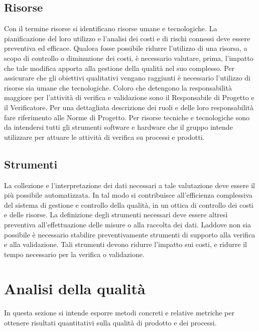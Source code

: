 \documentclass[12pt,a4paper]{article}
\begin{document}
	\subsection{Risorse}\label{risorse}
	Con il termine risorse si identificano risorse umane e tecnologiche. La pianificazione del loro utilizzo e l'analisi dei costi e di rischi connessi deve essere preventiva ed efficace. Qualora fosse possibile ridurre l'utilizzo di una risorsa, a scopo di controllo o diminuzione dei costi, è necessario valutare, prima, l'impatto che tale modifica apporta alla gestione della qualità nel suo complesso.
	Per assicurare che gli obiettivi qualitativi vengano raggiunti è necessario l'utilizzo di
	risorse sia umane che tecnologiche. Coloro che detengono la responsabilità maggiore
	per l'attività di verifica e validazione sono il Responsabile di Progetto e il Verificatore.
	Per una dettagliata descrizione dei ruoli e delle loro responsabilità fare riferimento alle
	Norme di Progetto.
	Per risorse tecniche e tecnologiche sono da intendersi tutti gli strumenti software e hardware che il gruppo intende utilizzare per attuare le attività di verifica su processi
	e prodotti. 
	
	\subsection{Strumenti}

	La collezione e l'interpretazione dei dati necessari a tale valutazione deve essere il più possibile automatizzata. In tal modo si contribuisce all'efficienza complessiva del sistema di gestione e controllo della qualità, in un ottica di controllo dei costi e delle risorse. La definizione degli strumenti necessari deve essere altresì preventiva all'effettuazione delle misure o alla raccolta dei dati.
	Laddove non sia possibile è necessario stabilire preventivamente strumenti di supporto alla verifica e alla validazione. Tali strumenti devono ridurre l'impatto sui costi, e ridurre il tempo necessario per la verifica o validazione. 
	

	
	\newpage
	
	\section{Analisi della qualità}\label{analisi}
	
	In questa sezione si intende esporre metodi concreti e relative metriche per ottenere risultati quantitativi sulla qualità di prodotto e dei processi. 
	
\end{document}

